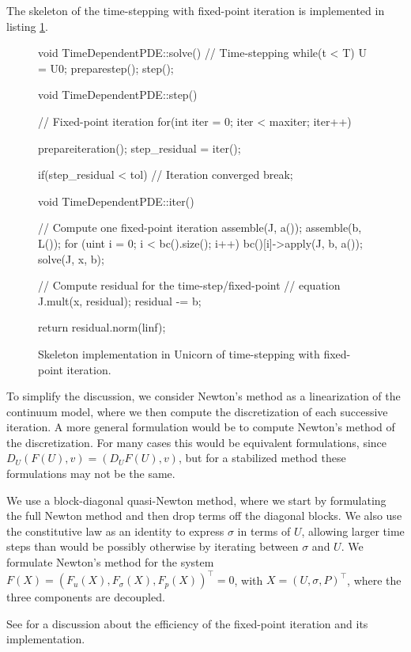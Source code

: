 The skeleton of the time-stepping with fixed-point iteration is
implemented in listing \ref{code:time-stepping}.

\begin{figure}
\begin{c++}
void TimeDependentPDE::solve()
{
  // Time-stepping
  while(t < T)
  {
    U = U0;
    preparestep();
    step();
  }
}

void TimeDependentPDE::step()
{
  // Fixed-point iteration
  for(int iter = 0; iter < maxiter; iter++)
  {
    prepareiteration();
    step_residual = iter();

    if(step_residual < tol)
    {
      // Iteration converged
      break;
    }
  }
}

void TimeDependentPDE::iter()
{
  // Compute one fixed-point iteration
  assemble(J, a());
  assemble(b, L());
  for (uint i = 0; i < bc().size(); i++)
    bc()[i]->apply(J, b, a());
  solve(J, x, b);

  // Compute residual for the time-step/fixed-point
  // equation
  J.mult(x, residual);
  residual -= b;

  return residual.norm(linf);
}
\end{c++}
\label{code:time-stepping}
\caption{Skeleton implementation in Unicorn of time-stepping with
fixed-point iteration.}
\end{figure}

To simplify the discussion, we consider Newton's method as a linearization
of the continuum model, where we then compute the discretization of each
successive iteration. A more general formulation would be to compute
Newton's method of the discretization. For many cases this would be
equivalent formulations, since $D_U (F(U), v) = (D_U F(U), v)$, but for
a stabilized method these formulations may not be the same.

We use a block-diagonal quasi-Newton method, where we start by formulating
the full Newton method and then drop terms off the diagonal blocks. We
also use the constitutive law as an identity to express $\sigma$ in terms
of $U$, allowing larger time steps than would be possibly otherwise by
iterating between $\sigma$ and $U$. We formulate Newton's method for
the system $F(X) = (F_u(X), F_\sigma(X), F_p(X))^\top = 0$, with $X =
(U, \sigma, P)^\top$, where the three components are decoupled.

See \citet{Jansson2009} for a discussion about the efficiency of the
fixed-point iteration and its implementation.

\subsection{}

